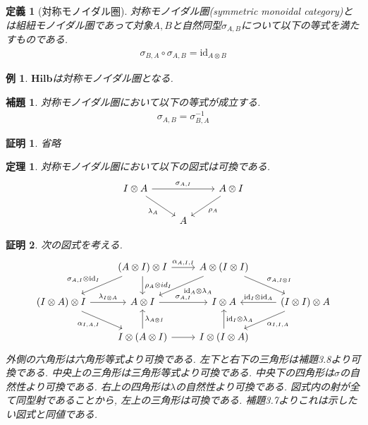 \documentclass[a4paper,12pt]{ltjsarticle}
\theoremstyle{break}
\newtheorem{defn}[thm]{定義}
\newtheorem{lem}[thm]{補題}
\newtheorem{thrm}[thm]{定理}
\newtheorem{eg}[thm]{例}
\newtheorem*{prf}{証明}
\newcommand{\rel}{\mathbf{Rel}}
\newcommand{\hilb}{\mathbf{Hilb}}
\newcommand{\xr}[1]{\xrightarrow{#1}}
\newcommand{\id}{\mathrm{id}}
\newcommand{\ci}{\circ}
\newcommand{\al}{\alpha}
\newcommand{\la}{\lambda}
\newcommand{\si}{\sigma}
\newcommand{\ot}{\otimes}
\newcommand{\ti}{\times}
\numberwithin{equation}{section}
\begin{document}

\begin{defn}[対称モノイダル圏]
  対称モノイダル圏(symmetric monoidal category)とは組紐モノイダル圏であって対象$A,B$と自然同型$\si_{A,B}$について以下の等式を満たすものである. 
  \begin{align*}
    \si_{B,A} \ci \si_{A,B} = \id_{A \ot B}
  \end{align*}
\end{defn}

\begin{eg}
  $\hilb$は対称モノイダル圏となる. 
\end{eg}

\begin{lem}
  対称モノイダル圏において以下の等式が成立する. 
  \begin{align*}
    \si_{A,B}=\si_{B,A}^{-1}
  \end{align*}
\end{lem} 

\begin{prf}
  省略
\end{prf}

\begin{thrm}
  対称モノイダル圏において以下の図式は可換である. 
  \[\begin{tikzcd}
    {I \ot A} && {A \ot I} \\
    & A
    \arrow["{\si_{A,I}}", from=1-1, to=1-3]
    \arrow["{\la_A}"', from=1-1, to=2-2]
    \arrow["{\rho_A}", from=1-3, to=2-2]
  \end{tikzcd}\]
\end{thrm}

\begin{prf}
  次の図式を考える. 
  \[\begin{tikzcd}
    & {(A \ot I) \ot I} & {A \ot (I \ot I)} \\
    {(I \ot A) \ot I} & {A \ot I} & {I \ot A} & {(I \ot I) \ot A} \\
    & {I \ot (A \ot I)} & {I \ot (I \ot A)}
    \arrow["{\si_{A,I} \ot \id_I}"', from=1-2, to=2-1]
    \arrow["{\rho_A \ot id_I}", from=1-2, to=2-2]
    \arrow["{\la_{I \ot A}}", from=2-1, to=2-2]
    \arrow["{\al_{I,A,I}}"', from=2-1, to=3-2]
    \arrow["{\la_{A \ot I}}"', from=3-2, to=2-2]
    \arrow["{\al_{A,I,I}}", from=1-2, to=1-3]
    \arrow["{\id_A \ot \la_A}", from=1-3, to=2-2]
    \arrow["{\si_{A,I}}", from=2-2, to=2-3]
    \arrow["{\id_I \ot \id_A}"', from=2-4, to=2-3]
    \arrow["{\al_{I,I,A}}", from=2-4, to=3-3]
    \arrow["{\id_I \ot \la_A}"', from=3-3, to=2-3]
    \arrow[from=3-2, to=3-3]
    \arrow["{\si_{A,I \ot I}}", from=1-3, to=2-4]
  \end{tikzcd}\]
  外側の六角形は六角形等式より可換である. 
  左下と右下の三角形は補題3.8より可換である. 
  中央上の三角形は三角形等式より可換である. 
  中央下の四角形は$\si$の自然性より可換である. 
  右上の四角形は$\la$の自然性より可換である. 
  図式内の射が全て同型射であることから, 左上の三角形は可換である. 
  補題3.7よりこれは示したい図式と同値である. 
\end{prf}
\end{document}
